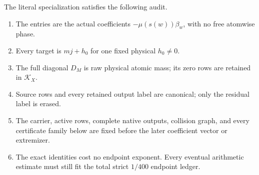 The literal specialization satisfies the following audit.
\begin{enumerate}[label=\textup{(L1.\arabic*)},leftmargin=4em]
 \item The entries are the actual coefficients
       \(-\mu(s(w))\beta_w\), with no free atomwise phase.
 \item Every target is \(mj+h_0\) for one fixed physical \(h_0\ne0\).
 \item The full diagonal \(D_M\) is raw physical atomic mass; its zero
       rows are retained in \(\mathcal K_X\).
 \item Source rows and every retained output label are canonical; only the
       residual label is erased.
 \item The carrier, active rows, complete native outputs, collision graph,
       and every certificate family below are fixed before the later
       coefficient vector or extremizer.
 \item The exact identities cost no endpoint exponent.  Every eventual
       arithmetic estimate must still fit the total strict \(1/400\)
       endpoint ledger.
\end{enumerate}
